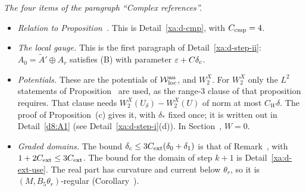 \begin{detail}\label{xa:d-AB-ref}
\emph{The four items of the paragraph ``Complex references''.}
\begin{itemize}
\item \emph{Relation to Proposition~.} This is Detail~\ref{xa:d-cmp}, with $C_{\rm cmp}=4$.
\item \emph{The local gauge.} This is the first paragraph of Detail~\ref{xa:d-step-ii}: $A_0=\tilde A'\oplus A_r$ satisfies (B) with parameter $\varepsilon+C\delta_c$.
\item \emph{Potentials.} These are the potentials of $\mathcal W^{\rm an}_{\rm loc}$, and $W_2^X$. For $W_2^X$ only the $L^2$ statements of Proposition~ are used, as the range-$3$ clause of that proposition requires. That clause needs $W_2^X(U_\delta)-W_2^X(U)$ of norm at most $C_W\delta$. The proof of Proposition~(c) gives it, with $\delta_*$ fixed once; it is written out in Detail~\ref{d8:A1} (see Detail~\ref{xa:d-step-i}(d)). In Section~, $W=0$.
\item \emph{Graded domains.} The bound $\delta_c\le3C_{\rm ext}(\delta_0+\delta_1)$ is that of Remark~, with $1+2C_{\rm ext}\le3C_{\rm ext}$. The bound for the domain of step $k+1$ is Detail~\ref{xa:d-ext-use}. The real part has curvature and current below $\theta_r$, so it is $(M,B_5\theta_r)$-regular (Corollary~).
\end{itemize}
\end{detail}

